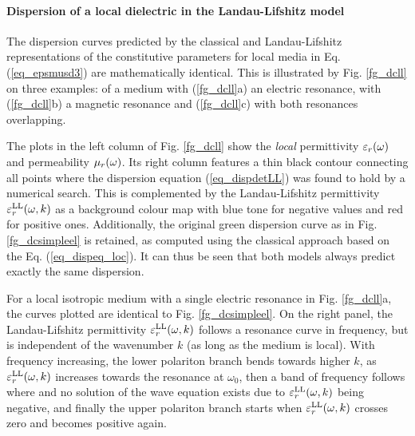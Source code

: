 \paragraph{Dispersion of a local dielectric in the Landau-Lifshitz model} %
The dispersion curves predicted by the classical and Landau-Lifshitz representations of the constitutive parameters for local media in Eq. (\ref{eq_epsmusd3}) are mathematically identical. This is illustrated by Fig. \ref{fg_dcll} on three examples: of a medium with (\ref{fg_dcll}a) an electric resonance, with (\ref{fg_dcll}b) a magnetic resonance and (\ref{fg_dcll}c) with both resonances overlapping. 

The plots in the left column of Fig. \ref{fg_dcll} show the \textit{local} permittivity $\varepsilon_r(\omega)$ and permeability $\mu_r(\omega)$.
Its right column features a thin black contour connecting all points where the dispersion equation (\ref{eq_dispdetLL}) was found to hold by a numerical search.
This is complemented by the Landau-Lifshitz permittivity $\varepsilon_r^\text{LL}(\omega, k)$ as a background colour map with blue tone for negative values and red for positive ones. 
Additionally, the original green dispersion curve as in Fig. \ref{fg_dcsimpleel} is retained, as computed using the classical approach based on the Eq. (\ref{eq_dispeq_loc}). It can thus be seen that both models always predict exactly the same dispersion.

For a local isotropic medium with a single electric resonance in Fig. \ref{fg_dcll}a, the curves plotted are identical to Fig. \ref{fg_dcsimpleel}. On the right panel, the Landau-Lifshitz permittivity $\varepsilon_r^\text{LL}(\omega, k)$ follows a resonance curve in frequency, but is independent of the wavenumber $k$ (as long as the medium is local). With frequency increasing, the lower polariton branch bends towards higher $k$, as $\varepsilon_r^\text{LL}(\omega, k)$ increases towards the resonance at $\omega_0$, then a band of frequency follows where and no solution of the wave equation %
exists due to $\varepsilon_r^\text{LL}(\omega, k)$ being negative, and finally the upper polariton branch starts when $\varepsilon_r^\text{LL}(\omega, k)$ crosses zero and becomes positive again.

